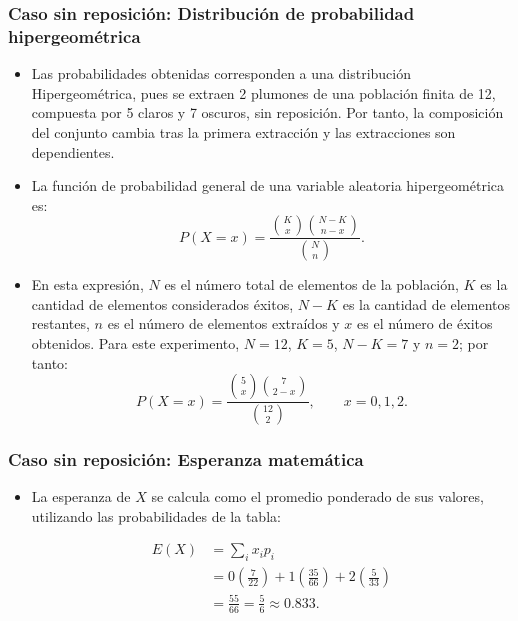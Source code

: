 \documentclass[10pt,letterpaper]{article}
\begin{document}
\subsubsection{Caso sin reposición: Distribución de probabilidad hipergeométrica}
\begin{itemize}
    \item Las probabilidades obtenidas corresponden a una distribución Hipergeométrica, pues se extraen 2 plumones de una población finita de 12, compuesta por 5 claros y 7 oscuros, sin reposición. Por tanto, la composición del conjunto cambia tras la primera extracción y las extracciones son dependientes.
    \item La función de probabilidad general de una variable aleatoria hipergeométrica es:
    \begin{equation}
        P(X=x)=\frac{\binom{K}{x}\binom{N-K}{n-x}}{\binom{N}{n}}.
    \end{equation}
    \item En esta expresión, $N$ es el número total de elementos de la población, $K$ es la cantidad de elementos considerados éxitos, $N-K$ es la cantidad de elementos restantes, $n$ es el número de elementos extraídos y $x$ es el número de éxitos obtenidos. Para este experimento, $N=12$, $K=5$, $N-K=7$ y $n=2$; por tanto:
    \begin{equation}
        P(X=x)=\frac{\binom{5}{x}\binom{7}{2-x}}{\binom{12}{2}},
        \qquad x=0,1,2.
    \end{equation}
\end{itemize}

\subsubsection{Caso sin reposición: Esperanza matemática}

\begin{itemize}
    \item La esperanza de $X$ se
    calcula como el promedio ponderado de sus valores, utilizando las
    probabilidades de la tabla:

        \begin{equation}
        \begin{aligned}
        E(X) &= \sum_i x_i p_i \\
            &= 0\left(\frac{7}{22}\right)
            + 1\left(\frac{35}{66}\right)
            + 2\left(\frac{5}{33}\right) \\
            &= \frac{55}{66}
            = \frac{5}{6}
            \approx 0.833.
        \end{aligned}
        \end{equation}

\end{itemize} 
\end{document}
